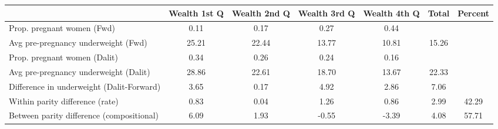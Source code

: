 \begin{tabular}{l*{6}{c}}
\toprule
            &\multicolumn{1}{c}{Wealth 1st Q}&\multicolumn{1}{c}{Wealth 2nd Q}&\multicolumn{1}{c}{Wealth 3rd Q}&\multicolumn{1}{c}{Wealth 4th Q}&\multicolumn{1}{c}{Total}&\multicolumn{1}{c}{Percent}\\
\midrule
\midrule
Prop. pregnant women (Fwd)&        0.11&        0.17&        0.27&        0.44&            &            \\
Avg pre-pregnancy underweight (Fwd)&       25.21&       22.44&       13.77&       10.81&       15.26&            \\
Prop. pregnant women (Dalit)&        0.34&        0.26&        0.24&        0.16&            &            \\
Avg pre-pregnancy underweight (Dalit)&       28.86&       22.61&       18.70&       13.67&       22.33&            \\
Difference in underweight (Dalit-Forward)&        3.65&        0.17&        4.92&        2.86&        7.06&            \\
Within parity difference (rate)&        0.83&        0.04&        1.26&        0.86&        2.99&       42.29\\
Between parity difference (compositional)&        6.09&        1.93&       -0.55&       -3.39&        4.08&       57.71\\
\bottomrule
\end{tabular}
